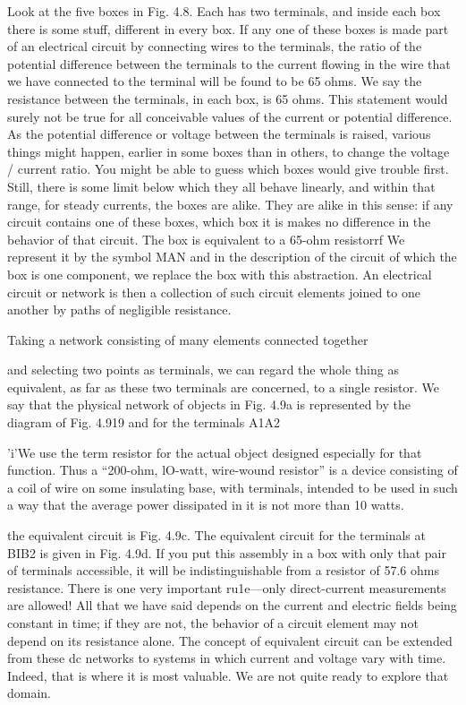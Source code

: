 Look at the five boxes in Fig. 4.8. Each has two terminals, and
inside each box there is some stuff, different in every box. If any one
of these boxes is made part of an electrical circuit by connecting wires
to the terminals, the ratio of the potential difference between the
terminals to the current flowing in the wire that we have connected
to the terminal will be found to be 65 ohms. We say the resistance
between the terminals, in each box, is 65 ohms. This statement
would surely not be true for all conceivable values of the current or
potential difference. As the potential difference or voltage between
the terminals is raised, various things might happen, earlier in some
boxes than in others, to change the voltage / current ratio. You might
be able to guess which boxes would give trouble first. Still, there is
some limit below which they all behave linearly, and within that
range, for steady currents, the boxes are alike. They are alike in this
sense: if any circuit contains one of these boxes, which box it is makes
no difference in the behavior of that circuit. The box is equivalent
to a 65-ohm resistorrf We represent it by the symbol MAN and
in the description of the circuit of which the box is one component,
we replace the box with this abstraction. An electrical circuit or
network is then a collection of such circuit elements joined to one
another by paths of negligible resistance.

Taking a network consisting of many elements connected together

and selecting two points as terminals, we can regard the whole thing
as equivalent, as far as these two terminals are concerned, to a single
resistor. We say that the physical network of objects in Fig. 4.9a is
represented by the diagram of Fig. 4.919 and for the terminals A1A2

'i'We use the term resistor for the actual object designed especially for that function.
Thus a ``200-ohm, lO-watt, wire-wound resistor'' is a device consisting of a coil of wire
on some insulating base, with terminals, intended to be used in such a way that the average
power dissipated in it is not more than 10 watts.

the equivalent circuit is Fig. 4.9c. The equivalent circuit for the terminals
at BIB2 is given in Fig. 4.9d. If you put this assembly in a
box with only that pair of terminals accessible, it will be indistinguishable
from a resistor of 57.6 ohms resistance. There is one very
important ru1e---only direct-current measurements are allowed! All
that we have said depends on the current and electric fields being
constant in time; if they are not, the behavior of a circuit element
may not depend on its resistance alone. The concept of equivalent
circuit can be extended from these dc networks to systems in which
current and voltage vary with time. Indeed, that is where it is most
valuable. We are not quite ready to explore that domain.

